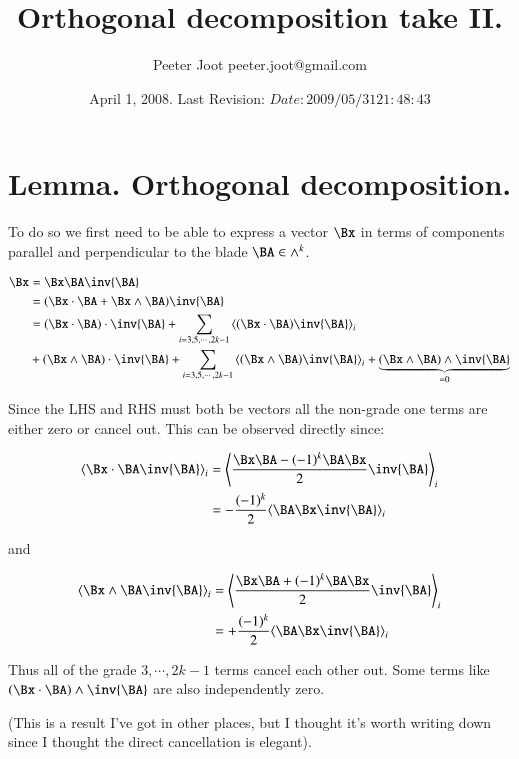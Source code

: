 \documentclass{article}      %
\title{ Orthogonal decomposition take II. } %
\author{Peeter Joot \quad peeter.joot@gmail.com}         %
\date{ April 1, 2008.  Last Revision: $Date: 2009/05/31 21:48:43 $ }
\newcommand{\gpgrade}[2] {{\left\langle{{#1}}\right\rangle}_{#2}}
\begin{document}

\maketitle{}

\section{ Lemma.  Orthogonal decomposition. }
To do so we first need to be able to express a vector $\Bx$ in terms
of components parallel and perpendicular to the blade $\BA \in \wedge^k$.

\begin{align*}
\Bx 
&= \Bx \BA \inv{\BA} \\
&= (\Bx \cdot \BA + \Bx \wedge \BA) \inv{\BA} \\
&= 
(\Bx \cdot \BA) \cdot \inv{\BA}
+ \sum_{i=3,5,\cdots,2k-1} \gpgrade{(\Bx \cdot \BA) \inv{\BA}}{i} \\
&+ 
(\Bx \wedge \BA) \cdot \inv{\BA}
+ \sum_{i=3,5,\cdots,2k-1} \gpgrade{(\Bx \wedge \BA) \inv{\BA}}{i} 
+ \underbrace{(\Bx \wedge \BA) \wedge \inv{\BA}}_{=0}
\end{align*}

Since the LHS and RHS must both be vectors all the non-grade one terms
are either zero or cancel out.  This can be observed directly since:

\begin{align*}
\gpgrade{\Bx \cdot \BA \inv{\BA}}{i}
&= \gpgrade{ \frac{\Bx \BA - (-1)^{k}\BA\Bx}{2}\inv{\BA} }{i}  \\
&= -\frac{(-1)^{k}}{2} \gpgrade{ \BA\Bx \inv{\BA} }{i}  \\
\end{align*}

and

\begin{align*}
\gpgrade{\Bx \wedge \BA \inv{\BA}}{i} 
&= \gpgrade{ \frac{\Bx \BA + (-1)^{k}\BA\Bx}{2}\inv{\BA} }{i}  \\
&= +\frac{(-1)^{k}}{2} \gpgrade{ \BA\Bx \inv{\BA} }{i}  \\
\end{align*}

Thus all of the grade $3, \cdots ,2k-1$ terms cancel each other out.  Some terms
like $(\Bx \cdot \BA) \wedge \inv{\BA}$ are also independently zero.

(This is a result I've got in other places, but I thought it's worth
 writing down since I thought the direct cancellation is elegant).
\end{document}
